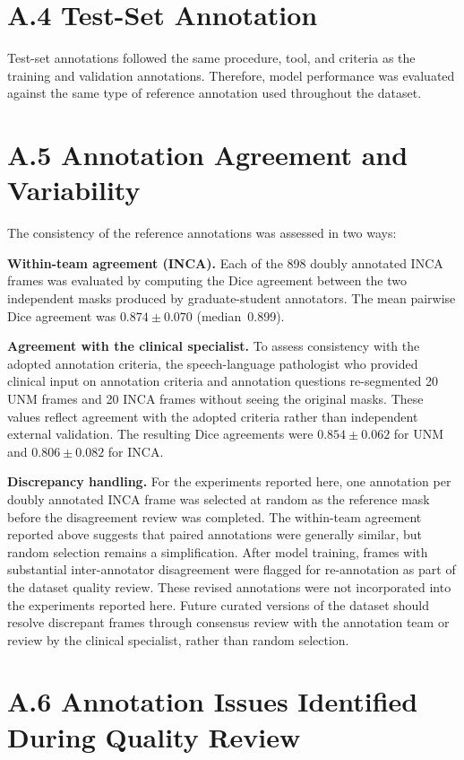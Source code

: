 \documentclass[
  msc,
  american
]{ThesisPUC_v2}
\begin{document}
\section*{A.4 Test-Set Annotation}

Test-set annotations followed the same procedure, tool, and criteria as the training and validation annotations. Therefore, model performance was evaluated against the same type of reference annotation used throughout the dataset.

\section*{A.5 Annotation Agreement and Variability}

The consistency of the reference annotations was assessed in two ways:

\textbf{Within-team agreement (INCA).} Each of the 898 doubly annotated INCA frames was evaluated by computing the Dice agreement between the two independent masks produced by graduate-student annotators. The mean pairwise Dice agreement was $0.874 \pm 0.070$ (median~0.899).

\textbf{Agreement with the clinical specialist.} To assess consistency with the adopted annotation criteria, the speech-language pathologist who provided clinical input on annotation criteria and annotation questions re-segmented 20 UNM frames and 20 INCA frames without seeing the original masks. These values reflect agreement with the adopted criteria rather than independent external validation. The resulting Dice agreements were $0.854 \pm 0.062$ for UNM and $0.806 \pm 0.082$ for INCA.

\textbf{Discrepancy handling.} For the experiments reported here, one annotation per doubly annotated INCA frame was selected at random as the reference mask before the disagreement review was completed. The within-team agreement reported above suggests that paired annotations were generally similar, but random selection remains a simplification. After model training, frames with substantial inter-annotator disagreement were flagged for re-annotation as part of the dataset quality review. These revised annotations were not incorporated into the experiments reported here. Future curated versions of the dataset should resolve discrepant frames through consensus review with the annotation team or review by the clinical specialist, rather than random selection.

\section*{A.6 Annotation Issues Identified During Quality Review}
\end{document}
